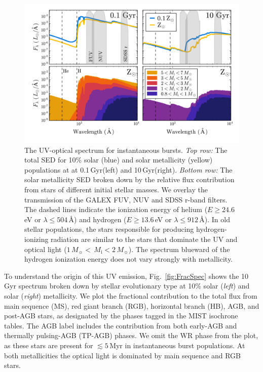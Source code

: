 \documentclass[preprint2]{aastex62}
\newcommand\Msun{\ensuremath{\,M_{\sun}}\xspace}
\newcommand\Mi{\ensuremath{\,M_{\mathrm{i}}}\xspace}
\newcommand{\ang}{\ensuremath{\mbox{\AA}}\xspace}
\newcommand{\Myr}{$\,$Myr\xspace}
\newcommand{\Gyr}{$\,$Gyr\xspace}
\begin{document}
\begin{figure}
  \begin{center}
    \includegraphics[width=\linewidth]{figs/f1.png}
    \caption{{\sc The UV-optical spectrum for instantaneous bursts.} \emph{Top row:} The total SED for 10\% solar (blue) and solar metallicity (yellow) populations at at 0.1\Gyr (left) and 10\Gyr (right). \emph{Bottom row:} The solar metallicity SED broken down by the relative flux contribution from stars of different initial stellar masses. We overlay the transmission of the GALEX FUV, NUV and SDSS r-band filters. The dashed lines indicate the ionization energy of helium ($E\geq24.6\,$eV or $\lambda \leq 504\,$\ang) and hydrogen ($E\geq13.6\,$eV or $\lambda \leq 912\,$\ang). In old stellar populations, the stars responsible for producing hydrogen-ionizing radiation are similar to the stars that dominate the UV and optical light ($1\Msun < \Mi < 2\Msun$). The spectrum blueward of the hydrogen ionization energy does not vary strongly with metallicity.}
    \label{fig:ionSpec}
  \end{center}
\end{figure}

To understand the origin of this UV emission, Fig.~\ref{fig:FracSpec} shows the 10\Gyr spectrum broken down by stellar evolutionary type at 10\% solar (\emph{left}) and solar (\emph{right}) metallicity. We plot the fractional contribution to the total flux from main sequence (MS), red giant branch (RGB), horizontal branch (HB), AGB, and post-AGB stars, as designated by the phases tagged in the MIST isochrone tables. The AGB label includes the contribution from both early-AGB and thermally pulsing-AGB (TP-AGB) phases. We omit the WR phase from the plot, as these stars are present for $\lesssim5$\Myr in instantaneous burst populations. At both metallicities the optical light is dominated by main sequence and RGB stars. 
\end{document}
